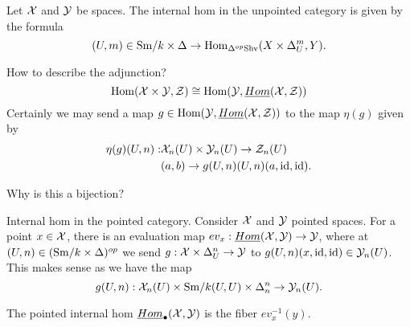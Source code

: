\documentclass{amsart}%
\begin{document}
\begin{enumerate}
\begin{definition}
  Let $\mathcal{X}$ and $\mathcal{Y}$ be spaces. The internal hom in
  the unpointed category is given by the formula
  \begin{equation*}
    (U,m) \in \mathrm{Sm}/k\times \Delta \to \operatorname{Hom}_{\Delta^{op}\mathrm{Shv}}(X \times \Delta^{m}_U, Y).
  \end{equation*}

  How to describe the adjunction? 
  \begin{equation*}
    \operatorname{Hom}(\mathcal{X} \times \mathcal{Y}, \mathcal{Z}) \cong \operatorname{Hom}(\mathcal{Y}, \underline{Hom}(\mathcal{X}, \mathcal{Z}))
  \end{equation*}
  Certainly we may send a map
  $g \in \operatorname{Hom}(\mathcal{Y}, \underline{Hom}(\mathcal{X}, \mathcal{Z}))$ to the map
  $\eta(g)$ given by 
  \begin{align*}
    \eta(g)(U,n) : &\mathcal{X}_n(U)\times \mathcal{Y}_n(U) \to \mathcal{Z}_n(U) \\ 
                   & (a,b) \to g(U,n)(U,n)(a,\operatorname{id},\operatorname{id}).
  \end{align*}

  Why is this a bijection? 
\end{definition}

\begin{definition}
  Internal hom in the pointed category. Consider $\mathcal{X}$ and $\mathcal{Y}$
  pointed spaces. For a point $x \in \mathcal{X}$, there is an evaluation
  map $ev_x : \underline{Hom}(\mathcal{X}, \mathcal{Y}) \to \mathcal{Y}$, where at
  $(U,n) \in (\mathrm{Sm}/k \times \Delta)^{op}$ we send
  $g : \mathcal{X} \times \Delta^n_U \to \mathcal{Y}$ to
  $g(U,n)(x, \operatorname{id}, \operatorname{id}) \in \mathcal{Y}_n(U)$. This makes sense as we have
  the map
  \begin{equation*}
    g(U,n) : \mathcal{X}_n(U) \times \mathrm{Sm}/k(U,U) \times \Delta^n_n \to \mathcal{Y}_n(U).
  \end{equation*}

  The pointed internal hom $\underline{Hom}_{\bullet}(\mathcal{X}, \mathcal{Y})$
  is the fiber $ev_{x}^{-1}(y)$. 
\end{definition}

\end{enumerate}
\end{document}
